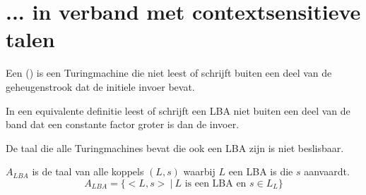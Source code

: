 \documentclass[main.tex]{subfiles}
\begin{document}

\section{... in verband met contextsensitieve talen}
\label{sec:-verb-met-csls}


\begin{de}
  \label{de:linear-begrensde-automaat}
  Een  () is een Turingmachine die niet leest of schrijft buiten een deel van de geheugenstrook dat de initiele invoer bevat.
\end{de}

\begin{st}
  In een equivalente definitie leest of schrijft een LBA niet buiten een deel van de band dat een constante factor groter is dan de invoer.
\zb
\end{st}

\begin{st}
  De taal die alle Turingmachines bevat die ook een LBA zijn is niet beslisbaar.
\end{st}

\begin{de}
  \label{de:a-lba}
  $A_{LBA}$ is de taal van alle koppels $(L,s)$ waarbij $L$ een LBA is die $s$ aanvaardt.
  \[ A_{LBA} = \{ <L,s> \ |\ L \text{ is een LBA en } s \in L_{L}\} \]
\end{de}
\end{document}
